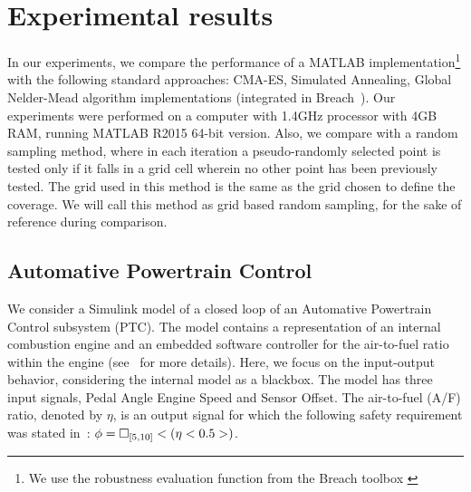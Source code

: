 \section{Experimental results}

In our experiments, we compare the performance of a MATLAB
implementation\footnote{We use the robustness evaluation function from
the Breach toolbox \cite{}}
with the following standard approaches: CMA-ES, Simulated Annealing, Global
Nelder-Mead algorithm implementations (integrated in
Breach~\cite{BreachCAV10}). Our experiments were performed on a computer with 1.4GHz processor with
4GB RAM, running MATLAB R2015 64-bit version.  Also, we compare with a
random sampling method, where in each iteration a pseudo-randomly
selected point is tested only if it falls in a grid cell wherein no
other point has been previously tested.  The grid used in this method
is the same as the grid chosen to define the coverage.  We will
call this method as grid based random sampling, for the sake of
reference during comparison.


\subsection{Automative Powertrain Control} \label{sec:PTC}
We consider a Simulink model of a closed loop of an Automative Powertrain Control
subsystem (PTC). The model contains a representation of an internal combustion engine and an
embedded software controller for the air-to-fuel ratio within the
engine (see~\cite{Dreossi2015} for more details). Here, we
focus on the input-output behavior, considering the
internal model as a blackbox. The model has three input signals,
Pedal Angle Engine Speed and Sensor Offset.
The air-to-fuel (A/F) ratio, denoted by $\eta$, is an
output signal for which the following safety requirement was stated
in~\cite{Dreossi2015}: $\phi = \Box_{[5,10]}<(\eta<0.5>)$.

